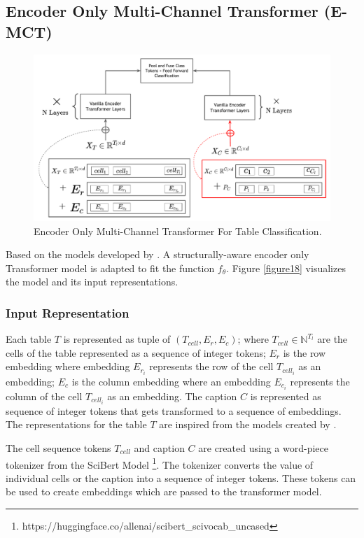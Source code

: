 \subsection{Encoder Only Multi-Channel Transformer (E-MCT)}
\label{table_classification:models:encoder-model}
\begin{figure}[h]
    \centering
    \includegraphics[width=\maxwidth{\textwidth}]{src/images/Pic-Export-Enc-Trans-Thesis.pdf}
    \caption{Encoder Only Multi-Channel Transformer For Table Classification. }
    \label{figure\arabic{figurecounter}}
\end{figure}
Based on the models developed by \cite{deng2020turl}. A structurally-aware encoder only Transformer model is adapted to fit the function $f_\theta$. Figure \ref{figure18} visualizes the model and its input representations.

\subsubsection{Input Representation}
\label{table_classification:models:encoder-model:input-rep}
Each table $T$ is represented as tuple of $(T_{cell},E_r,E_c)$; where $T_{cell} \in \mathbb{N}^{T_l}$ are the cells of the table represented as a sequence of integer tokens; $E_r$ is the row embedding where embedding $E_{r_{i}}$ represents the row of the cell $T_{cell_{i}}$ as an embedding;  $E_c$ is the column embedding where an embedding $E_{c_{i}}$ represents the column of the cell $T_{cell_{i}}$ as an embedding. The caption $C$ is represented as sequence of integer tokens that gets transformed to a sequence of embeddings. The representations for the table $T$ are inspired from the models created by \cite{deng2020turl}. 

The cell sequence tokens $T_{cell}$ and caption $C$ are created using a word-piece tokenizer from the SciBert Model \footnote{https://huggingface.co/allenai/scibert\_scivocab\_uncased}. The tokenizer converts the value of individual cells or the caption into a sequence of integer tokens. These tokens can be used to create embeddings which are passed to the transformer model. 

